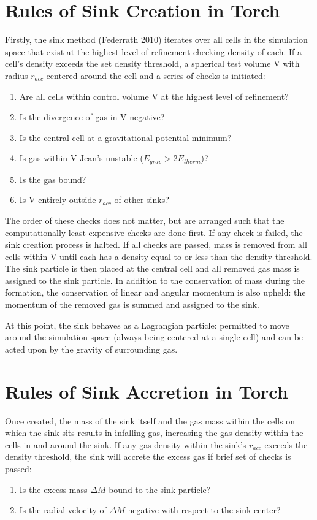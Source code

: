 \documentclass[10pt]{article}
\begin{document}
\section{Rules of Sink Creation in Torch}
Firstly, the sink method (Federrath 2010) iterates over all cells in the simulation space that exist at the highest level of refinement checking density of each. If a cell's density exceeds the set density threshold, a spherical test volume V with radius $r_{acc}$ centered around the cell and a series of checks is initiated:
\begin{enumerate}
\item Are all cells within control volume V at the highest level of refinement?
\item Is the divergence of gas in V negative?
\item Is the central cell at a gravitational potential minimum?
\item Is gas within V Jean's unstable ($E_{grav} > 2E_{therm}$)?
\item Is the gas bound?
\item Is V entirely outside $r_{acc}$ of other sinks?
\end{enumerate}

The order of these checks does not matter, but are arranged such that the computationally least expensive checks are done first. If any check is failed, the sink creation process is halted. If all checks are passed, mass is removed from all cells within V until each has a density equal to or less than the density threshold. The sink particle is then placed at the central cell and all removed gas mass is assigned to the sink particle. In addition to the conservation of mass during the formation, the conservation of linear and angular momentum is also upheld: the momentum of the removed gas is summed and assigned to the sink.

At this point, the sink behaves as a Lagrangian particle: permitted to move around the simulation space (always being centered at a single cell) and can be acted upon by the gravity of surrounding gas.

\section{Rules of Sink Accretion in Torch}
Once created, the mass of the sink itself and the gas mass within the cells on which the sink sits results in infalling gas, increasing the gas density within the cells in and around the sink. If any gas density within the sink's $r_{acc}$ exceeds the density threshold, the sink will accrete the excess gas if brief set of checks is passed:
\begin{enumerate}
\item Is the excess mass $\Delta M$ bound to the sink particle?
\item Is the radial velocity of $\Delta M$ negative with respect to the sink center?
\end{enumerate}
\end{document}
